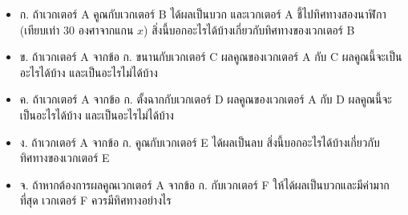 \begin{itemize}
\item ก. ถ้าเวกเตอร์ A คูณกับเวกเตอร์ B ได้ผลเป็นบวก และเวกเตอร์ A ชี้ไปทิศทางสองนาฬิกา (เทียบเท่า $30$ องศาจากแกน $x$) สิ่งนี้บอกอะไรได้บ้างเกี่ยวกับทิศทางของเวกเตอร์ B

\item ข. ถ้าเวกเตอร์ A จากข้อ ก. ขนานกับเวกเตอร์ C ผลคูณของเวกเตอร์ A กับ C ผลคูณนี้จะเป็นอะไรได้บ้าง และเป็นอะไรไม่ได้บ้าง

\item ค. ถ้าเวกเตอร์ A จากข้อ ก. ตั้งฉากกับเวกเตอร์ D ผลคูณของเวกเตอร์ A กับ D ผลคูณนี้จะเป็นอะไรได้บ้าง และเป็นอะไรไม่ได้บ้าง

\item ง. ถ้าเวกเตอร์ A จากข้อ ก. คูณกับเวกเตอร์ E ได้ผลเป็นลบ
สิ่งนี้บอกอะไรได้บ้างเกี่ยวกับทิศทางของเวกเตอร์ E

\item จ. ถ้าหากต้องการผลคูณเวกเตอร์ A จากข้อ ก. กับเวกเตอร์ F ให้ได้ผลเป็นบวกและมีค่ามากที่สุด เวกเตอร์ F ควรมีทิศทางอย่างไร
\end{itemize}


